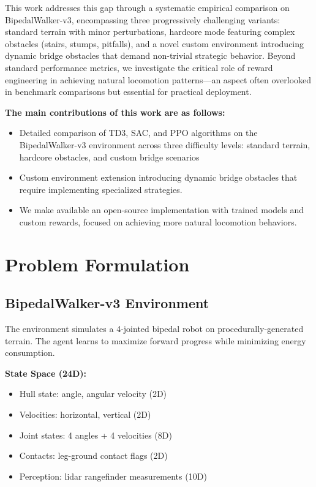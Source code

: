 \documentclass[10pt,a4paper,twocolumn]{article}
\begin{document}
This work addresses this gap through a systematic empirical comparison on BipedalWalker-v3, encompassing three progressively challenging variants: standard terrain with minor perturbations, hardcore mode featuring complex obstacles (stairs, stumps, pitfalls), and a novel custom environment introducing dynamic bridge obstacles that demand non-trivial strategic behavior. Beyond standard performance metrics, we investigate the critical role of reward engineering in achieving natural locomotion patterns—an aspect often overlooked in benchmark comparisons but essential for practical deployment.

\textbf{The main contributions of this work are as follows:}
\begin{itemize}
    \item Detailed comparison of TD3, SAC, and PPO algorithms on the BipedalWalker-v3 environment across three difficulty levels: standard terrain, hardcore obstacles, and custom bridge scenarios
    \item Custom environment extension introducing dynamic bridge obstacles that require implementing specialized strategies.
    \item We make available an open-source implementation with trained models and custom rewards, focused on achieving more natural locomotion behaviors.
\end{itemize}


\section{Problem Formulation}

\subsection{BipedalWalker-v3 Environment}

The environment simulates a 4-jointed bipedal robot on procedurally-generated terrain. The agent learns to maximize forward progress while minimizing energy consumption.

\textbf{State Space (24D):}
\begin{itemize}
    \item Hull state: angle, angular velocity (2D)
    \item Velocities: horizontal, vertical (2D)
    \item Joint states: 4 angles + 4 velocities (8D)
    \item Contacts: leg-ground contact flags (2D)
    \item Perception: lidar rangefinder measurements (10D)
\end{itemize}
\end{document}
